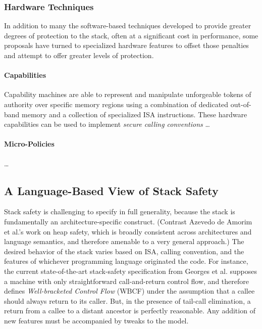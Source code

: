 \subsubsection{Hardware Techniques}

In addition to many the software-based techniques developed to provide greater
degrees of protection to the stack, often at a significant cost in performance,
some proposals have turned to specialized hardware features to offset those
penalties and attempt to offer greater levels of protection.
%

\paragraph{Capabilities}
%
%
Capability machines are able to represent and manipulate unforgeable tokens of
authority over specific memory regions using a combination of dedicated
out-of-band memory and a collection of specialized ISA instructions.
%
These hardware capabilities can be used to implement \emph{secure calling
conventions} \ldots

\paragraph{Micro-Policies}
%
%
\ldots

\subsection{A Language-Based View of Stack Safety}

Stack safety is challenging to specify in full generality, because the stack is fundamentally
an architecture-specific construct. (Contrast Azevedo de Amorim et al.'s \cite{DBLP:conf/post/AmorimHP18} work on heap safety,
which is broadly consistent across architectures and language semantics, and therefore amenable
to a very general approach.)
The desired behavior of the stack varies based on ISA, calling convention,
and the features of whichever programming language originated the code.
For instance, the current state-of-the-art stack-safety specification from Georges et al.
\cite{Georges22:TempsDesCerises} supposes a machine with only straightforward call-and-return
control flow, and therefore defines {\it Well-bracketed Control Flow} (WBCF) under the assumption that
a callee should always return to its caller. But, in the presence of tail-call elimination, a
return from a callee to a distant ancestor is perfectly reasonable. Any addition of new features
must be accompanied by tweaks to the model.
%

